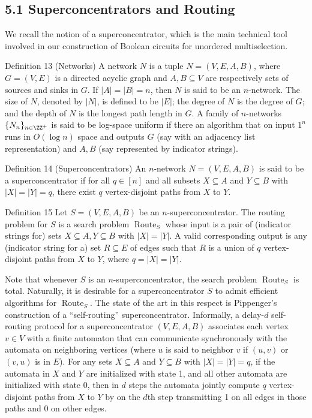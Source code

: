 \subsection*{5.1 Superconcentrators and Routing}
We recall the notion of a superconcentrator, which is the main technical tool involved in our construction of Boolean circuits for unordered multiselection.
\begin{originalresult}{Definition 13 (Networks)}
A network $N$ is a tuple $N=(V,E,A,B)$, where $G=(V,E)$ is a directed acyclic graph and $A,B\subseteq V$ are respectively sets of sources and sinks in $G$.
If $|A|=|B|=n$, then $N$ is said to be an $n$-network. The size of $N$, denoted by $|N|$, is defined to be $|E|$; the degree of $N$ is the degree of $G$; and the depth of $N$ is the longest path length in $G$.
A family of $n$-networks $\{N_n\}_{n\in\ZZ^+}$ is said to be log-space uniform if there an algorithm that on input $1^n$ runs in $O(\log n)$ space and outputs $G$ (say with an adjacency list representation) and $A,B$ (say represented by indicator strings).
\end{originalresult}
\begin{originalresult}{Definition 14 (Superconcentrators)}
An $n$-network $N=(V,E,A,B)$ is said to be a superconcentrator if for all $q\in[n]$ and all subsets $X\subseteq A$ and $Y\subseteq B$ with $|X|=|Y|=q$, there exist $q$ vertex-disjoint paths from $X$ to $Y$.
\end{originalresult}
\begin{originalresult}{Definition 15}
Let $S=(V,E,A,B)$ be an $n$-superconcentrator. The routing problem for $S$ is a search problem $\operatorname{Route}_S$ whose input is a pair of (indicator strings for) sets $X\subseteq A,Y\subseteq B$ with $|X|=|Y|$. A valid corresponding output is any (indicator string for a) set $R\subseteq E$ of edges such that $R$ is a union of $q$ vertex-disjoint paths from $X$ to $Y$, where $q=|X|=|Y|$.
\end{originalresult}
Note that whenever $S$ is an $n$-superconcentrator, the search problem $\operatorname{Route}_S$ is total. Naturally, it is desirable for a superconcentrator $S$ to admit efficient algorithms for $\operatorname{Route}_S$. The state of the art in this respect is Pippenger's construction of a ``self-routing'' superconcentrator.
Informally, a delay-$d$ self-routing protocol for a superconcentrator $(V,E,A,B)$ associates each vertex $v\in V$ with a finite automaton that can communicate synchronously with the automata on neighboring vertices (where $u$ is said to neighbor $v$ if $(u,v)$ or $(v,u)$ is in $E$). For any sets $X\subseteq A$ and $Y\subseteq B$ with $|X|=|Y|=q$, if the automata in $X$ and $Y$ are initialized with state 1, and all other automata are initialized with state 0, then in $d$ steps the automata jointly compute $q$ vertex-disjoint paths from $X$ to $Y$ by on the $d$th step transmitting 1 on all edges in those paths and 0 on other edges.
